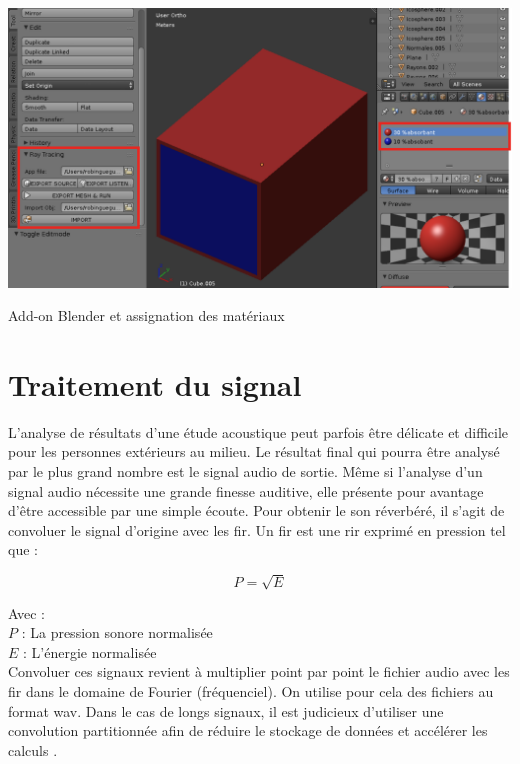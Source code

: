\begin{figureth}
	\includegraphics[width=\linewidth]{images/add-on}
	\caption{Add-on Blender et assignation des matériaux}
\end{figureth}

\section{Traitement du signal} \label{sect_TDS}

L'analyse de résultats d'une étude acoustique peut parfois être délicate et difficile pour les personnes extérieurs au milieu. Le résultat final qui pourra être analysé par le plus grand nombre est le signal audio de sortie. Même si l'analyse d'un signal audio nécessite une grande finesse auditive, elle présente pour avantage d'être accessible par une simple écoute. Pour obtenir le son réverbéré, il s'agit de convoluer le signal d'origine avec les \gls{fir}. Un \gls{fir} est une \gls{rir} exprimé en pression tel que :

\begin{equation}
P = \sqrt{E}
\end{equation}

Avec : \\
$P$ : La pression sonore normalisée \\
$E$ : L'énergie normalisée \\

Convoluer ces signaux revient à multiplier point par point le fichier audio avec les \gls{fir} dans le domaine de Fourier (fréquenciel).
On utilise pour cela des fichiers au format \gls{wav}. Dans le cas de longs signaux, il est judicieux d'utiliser une convolution partitionnée afin de réduire le stockage de données et accélérer les calculs \cite[2. Algorithm overview ]{partition}. 


